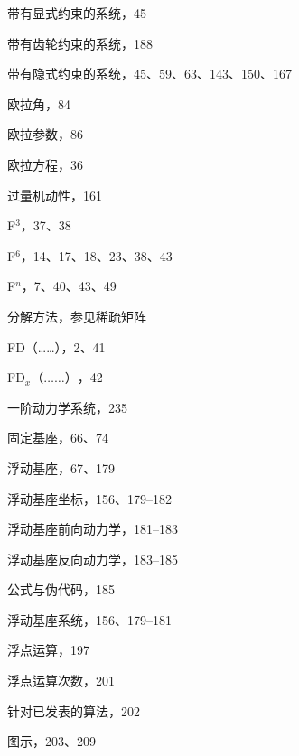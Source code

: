 \documentclass[10pt,a4paper]{book}
\theoremstyle{thmstyle} %
\theoremstyle{defstyle} %
\theoremstyle{prostyle} %
\begin{document}
带有显式约束的系统，45



带有齿轮约束的系统，188



带有隐式约束的系统，45、59、63、143、150、167



欧拉角，84



欧拉参数，86



欧拉方程，36



过量机动性，161



F$^{3}$，37、38



F$^{6}$，14、17、18、23、38、43



F$^{n}$，7、40、43、49



分解方法，参见稀疏矩阵



FD（……），2、41



FD$_{x}（……）$，42



一阶动力学系统，235



固定基座，66、74



浮动基座，67、179



浮动基座坐标，156、179–182



浮动基座前向动力学，181–183



浮动基座反向动力学，183–185



公式与伪代码，185



浮动基座系统，156、179–181



浮点运算，197



浮点运算次数，201



针对已发表的算法，202



图示，203、209
\end{document}
